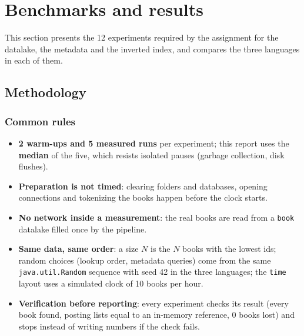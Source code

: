 \documentclass[11pt,a4paper]{article}
\newcommand{\code}[1]{\texttt{#1}}
\begin{document}
\section{Benchmarks and results}\label{sec:bench}
This section presents the 12 experiments required by the assignment for the datalake, the metadata
and the inverted index, and compares the three languages in each of them.

\subsection{Methodology}\label{sec:method}

\subsubsection{Common rules}
\begin{itemize}
  \item \textbf{2 warm-ups and 5 measured runs} per experiment; this report uses the \textbf{median}
        of the five, which resists isolated pauses (garbage collection, disk flushes).
  \item \textbf{Preparation is not timed}: clearing folders and databases, opening connections and
        tokenizing the books happen before the clock starts.
  \item \textbf{No network inside a measurement}: the real books are read from a \code{book} datalake
        filled once by the pipeline.
  \item \textbf{Same data, same order}: a size $N$ is the $N$ books with the lowest ids; random
        choices (lookup order, metadata queries) come from the same \code{java.util.Random}
        sequence with seed 42 in the three languages; the \code{time} layout uses a simulated clock
        of 10 books per hour.
  \item \textbf{Verification before reporting}: every experiment checks its result (every book
        found, posting lists equal to an in-memory reference, 0 books lost) and stops instead of
        writing numbers if the check fails.
\end{itemize}
\end{document}
